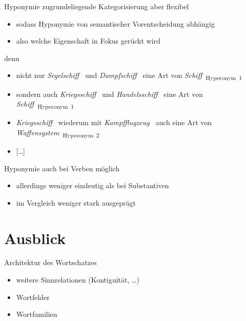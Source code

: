 \begin{frame}{Hyponymie}
\onslide<+->
zugrundeliegende Kategorisierung aber flexibel
\begin{itemize}[<+->]
	\item		sodass Hyponymie von semantischer Vorentscheidung abhängig
	\item		also welche Eigenschaft in Fokus gerückt wird
\end{itemize}
\onslide<+->
\Zeile
denn
\begin{itemize}[<+->]
	\item		nicht nur \textit{Segelschiff}~\textsubscript{} und \textit{Dampfschiff}~\textsubscript{} eine Art von \textit{Schiff}~\textsubscript{\alert{Hyperonym~1}}
	\item		sondern auch \textit{Kriegsschiff}~\textsubscript{} und \textit{Handelsschiff}~\textsubscript{} eine Art von \textit{Schiff}~\textsubscript{\alert{Hyperonym~1}}
	\item		\textit{Kriegsschiff}~\textsubscript{} wiederum mit \textit{Kampfflugzeug}~\textsubscript{} auch eine Art von \textit{Waffensystem}~\textsubscript{\alert{Hyperonym~2}}
	\item		{[\ldots]}
\end{itemize}
\end{frame}

\begin{frame}{Hyponymie}
\onslide<+->
auch bei Verben möglich
\begin{itemize}[<+->]
	\item		allerdings weniger eindeutig als bei Substantiven
	\item		im Vergleich weniger stark ausgeprägt
\end{itemize}
\onslide<+->
\Zeile
\begin{exe}
	\ex\label{ex:hyponymie-003}
    \begin{xlist}
		\onslide<+->
	\end{xlist}
\end{exe}
\end{frame}



\section{Ausblick}

\begin{frame}{Architektur des Wortschatzes}
\onslide<+->
\begin{itemize}[<+->]
  \item weitere Sinnrelationen (Kontiguität, \ldots)
	\item	Wortfelder
	\item	Wortfamilien
\end{itemize}
 \end{frame}
 

